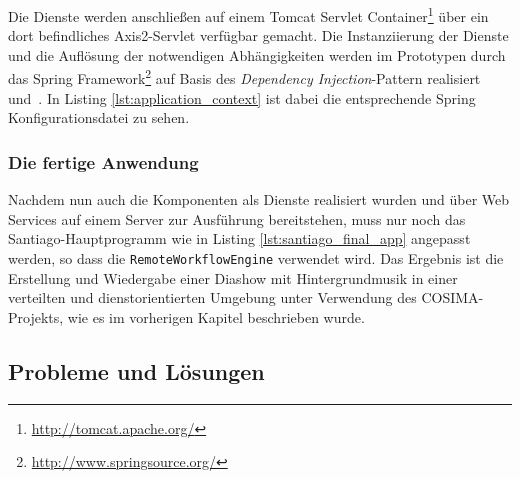   

  Die Dienste werden anschließen auf einem Tomcat Servlet Container\footnote{\url{http://tomcat.apache.org/}} über ein dort befindliches Axis2-Servlet verfügbar gemacht. Die Instanziierung der Dienste und die Auflösung der notwendigen Abhängigkeiten werden im Prototypen durch das Spring Framework\footnote{\url{http://www.springsource.org/}} auf Basis des \emph{Dependency Injection}-Pattern realisiert~\citep[S. 130]{johnson2004eoo} und~\citep{fowler04di}. In Listing \ref{lst:application_context} ist dabei die entsprechende Spring Konfigurationsdatei zu sehen.

  
  

\subsubsection{Die fertige Anwendung} %
\label{ssub:die_fertige_anwendung}

  Nachdem nun auch die Komponenten als Dienste realisiert wurden und über Web Services auf einem Server zur Ausführung bereitstehen, muss nur noch das Santiago-Hauptprogramm wie in Listing \ref{lst:santiago_final_app} angepasst werden, so dass die \verb!RemoteWorkflowEngine! verwendet wird. Das Ergebnis ist die Erstellung und Wiedergabe einer Diashow mit Hintergrundmusik in einer verteilten und dienstorientierten Umgebung unter Verwendung des COSIMA-Projekts, wie es im vorherigen Kapitel beschrieben wurde.

  
  

  
\subsection{Probleme und Lösungen} %
\label{sub:probleme_und_loesungen_architektur}

